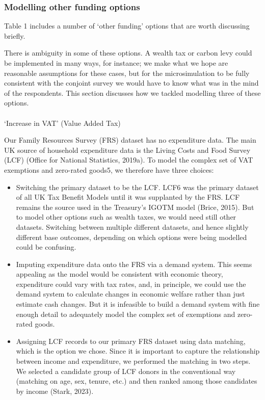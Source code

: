 \documentclass[
  letterpaper,
  DIV=11,
  numbers=noendperiod]{scrartcl}
\makeatletter
\let\oldparagraph\paragraph
\renewcommand{\paragraph}{
    \@ifstar
      \xxxParagraphStar
      \xxxParagraphNoStar
  }
\newcommand{\xxxParagraphStar}[1]{\oldparagraph*{#1}\mbox{}}
\newcommand{\xxxParagraphNoStar}[1]{\oldparagraph{#1}\mbox{}}
\providecommand{\tightlist}{%
  \setlength{\itemsep}{0pt}\setlength{\parskip}{0pt}}\usepackage{longtable,booktabs,array}
\makeatother
\begin{document}
\subsubsection{Modelling other funding
options}\label{modelling-other-funding-options}

Table 1 includes a number of `other funding' options that are worth
discussing briefly.

There is ambiguity in some of these options. A wealth tax or carbon levy
could be implemented in many ways, for instance; we make what we hope
are reasonable assumptions for these cases, but for the microsimulation
to be fully consistent with the conjoint survey we would have to know
what was in the mind of the respondents. This section discusses how we
tackled modelling three of these options.

\paragraph{`Increase in VAT' (Value Added
Tax)}\label{increase-in-vat-value-added-tax}

Our Family Resources Survey (FRS) dataset has no expenditure data. The
main UK source of household expenditure data is the Living Costs and
Food Survey (LCF) (Office for National Statistics, 2019a). To model the
complex set of VAT exemptions and zero-rated goods5, we therefore have
three choices:

\begin{itemize}
\tightlist
\item
  Switching the primary dataset to be the LCF. LCF6 was the primary
  dataset of all UK Tax Benefit Models until it was supplanted by the
  FRS. LCF remains the source used in the Treasury's IGOTM model (Brice,
  2015). But to model other options such as wealth taxes, we would need
  still other datasets. Switching between multiple different datasets,
  and hence slightly different base outcomes, depending on which options
  were being modelled could be confusing.
\item
  Imputing expenditure data onto the FRS via a demand system. This seems
  appealing as the model would be consistent with economic theory,
  expenditure could vary with tax rates, and, in principle, we could use
  the demand system to calculate changes in economic welfare rather than
  just estimate cash changes. But it is infeasible to build a demand
  system with fine enough detail to adequately model the complex set of
  exemptions and zero-rated goods.\\
\item
  Assigning LCF records to our primary FRS dataset using data matching,
  which is the option we chose. Since it is important to capture the
  relationship between income and expenditure, we performed the matching
  in two steps. We selected a candidate group of LCF donors in the
  conventional way (matching on age, sex, tenure, etc.) and then ranked
  among those candidates by income (Stark, 2023).
\end{itemize}
\end{document}
